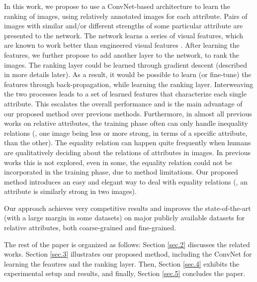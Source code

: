 In this work, we propose to use a ConvNet-based architecture to learn the ranking of images, using relatively annotated images for each attribute. Pairs of images with similar and/or different strengths of some particular attribute are presented to the network. The network  learns a series of visual features, which are known to work better than engineered visual features \cite{offtheshelf}. After learning the features, we further propose to add another layer to the network, to rank the images. The ranking layer could be learned through gradient descent (described in more details later). As a result, it would be possible to learn (or fine-tune) the features through back-propagation, while learning the ranking layer. Interweaving the two processes leads to a set of learned features that characterize each single attribute. This escalates the overall performance and is the main advantage of our proposed method over previous methods. Furthermore, in almost all previous works on relative attributes, the training phase often can only handle inequality relations (\ie, one image being less or more strong, in terms of a specific attribute, than the other). The equality relation can happen quite frequently when humans are qualitatively deciding about the relations of attributes in images. In previous works this is not explored, even in some, the equality relation could not be incorporated in the training phase, due to method limitations. Our proposed method introduces an easy and elegant way to deal with equality relations (\ie, an attribute is similarly strong in two images).

Our approach achieves very competitive results and improves the state-of-the-art (with a large margin in some datasets) on major publicly available datasets for relative attributes, both coarse-grained and fine-grained.

The rest of the paper is organized as follows: Section \ref{sec.2} discusses the related works. Section \ref{sec.3} illustrates our proposed method, including the ConvNet for learning the feautres and the ranking layer. Then, Section \ref{sec.4} exhibits the experimental setup and results, and finally, Section \ref{sec.5} concludes the paper.
